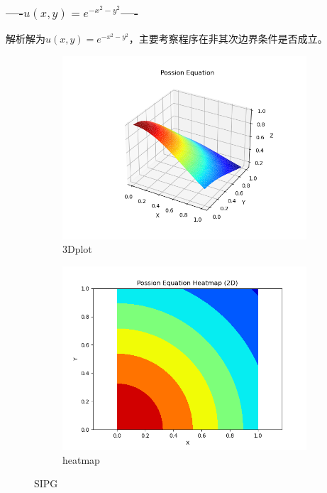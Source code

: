 \subsubsection*{----$u(x,y)=e^{-x^2-y^2}$----}
解析解为$u(x,y)=e^{-x^2-y^2}$，主要考察程序在非其次边界条件是否成立。
\begin{figure}[H]
    \centering  
    \begin{subfigure}{0.5\textwidth}  
        \centering  
        \includegraphics[width=0.9\linewidth]{./pics/final/possion/2d/3Dplot_ex.png}  
        \caption{3Dplot}  
    \end{subfigure}%
    \begin{subfigure}{0.5\textwidth}  
        \centering  
        \includegraphics[width=0.9\linewidth]{./pics/final/possion/2d/heatmap_ex.png}  
        \caption{heatmap}
    \end{subfigure}  
    \caption{SIPG}  


\end{figure}
